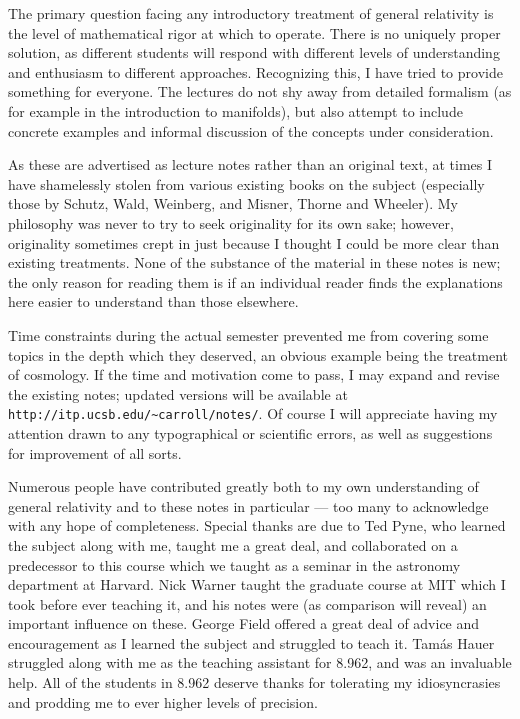 The primary question facing any introductory treatment of general
relativity is the level of mathematical rigor at which to operate.
There is no uniquely proper solution, as different students will
respond with different levels of understanding and enthusiasm to
different approaches.  Recognizing this, I have tried to provide
something for everyone.  The lectures do not shy away from
detailed formalism (as for example in the introduction to manifolds),
but also attempt to include concrete examples and informal
discussion of the concepts under consideration.  

As these are advertised as lecture notes rather than an original
text, at times I have shamelessly stolen from various existing books
on the subject (especially those by Schutz, Wald, Weinberg, and
Misner, Thorne and Wheeler).  My philosophy was never to try to seek
originality for its own sake; however, originality sometimes 
crept in just because I thought I could be more clear than existing
treatments.  None of the substance of the material in these notes is 
new; the only reason for reading them is if an individual reader
finds the explanations here easier to understand than those elsewhere.

Time constraints during the actual semester prevented me from
covering some topics in the depth which they deserved, an obvious
example being the treatment of cosmology.  If the time and motivation
come to pass, I may expand and revise the existing notes; updated
versions will be available at 
{\tt http://itp.ucsb.edu/{\~{}}carroll/notes/}.  Of course I will
appreciate having my attention drawn to any typographical or
scientific errors, as well as suggestions for improvement of
all sorts.

Numerous people have contributed greatly both to my own understanding
of general relativity and to these notes in particular --- too many
to acknowledge with any hope of completeness.  
Special thanks are due to Ted Pyne, who learned
the subject along with me, taught me a great deal,
and collaborated on a predecessor to this
course which we taught as a seminar in the astronomy department at
Harvard.  Nick Warner taught the graduate course at MIT which I
took before ever teaching it, and his notes were (as comparison will
reveal) an important influence on these.  George Field offered a
great deal of advice and encouragement as I learned the subject and
struggled to teach it.  Tam\'as Hauer struggled along with me as the 
teaching assistant for 8.962, and was an invaluable help.  All of
the students in 8.962 deserve thanks for tolerating my idiosyncrasies
and prodding me to ever higher levels of precision.

